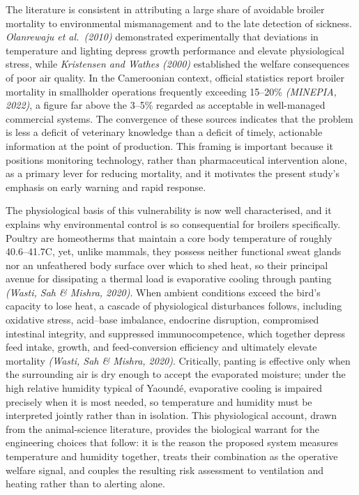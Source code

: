 \documentclass[12pt,a4paper]{report}
\begin{document}
The literature is consistent in attributing a large share of avoidable broiler mortality to environmental mismanagement and to the late detection of sickness. \textit{Olanrewaju et al.\ (2010)} demonstrated experimentally that deviations in temperature and lighting depress growth performance and elevate physiological stress, while \textit{Kristensen and Wathes (2000)} established the welfare consequences of poor air quality. In the Cameroonian context, official statistics report broiler mortality in smallholder operations frequently exceeding 15--20\% \textit{(MINEPIA, 2022)}, a figure far above the 3--5\% regarded as acceptable in well-managed commercial systems. The convergence of these sources indicates that the problem is less a deficit of veterinary knowledge than a deficit of timely, actionable information at the point of production. This framing is important because it positions monitoring technology, rather than pharmaceutical intervention alone, as a primary lever for reducing mortality, and it motivates the present study's emphasis on early warning and rapid response.

The physiological basis of this vulnerability is now well characterised, and it explains why environmental control is so consequential for broilers specifically. Poultry are homeotherms that maintain a core body temperature of roughly 40.6--41.7\textdegree C, yet, unlike mammals, they possess neither functional sweat glands nor an unfeathered body surface over which to shed heat, so their principal avenue for dissipating a thermal load is evaporative cooling through panting \textit{(Wasti, Sah \& Mishra, 2020)}. When ambient conditions exceed the bird's capacity to lose heat, a cascade of physiological disturbances follows, including oxidative stress, acid--base imbalance, endocrine disruption, compromised intestinal integrity, and suppressed immunocompetence, which together depress feed intake, growth, and feed-conversion efficiency and ultimately elevate mortality \textit{(Wasti, Sah \& Mishra, 2020)}. Critically, panting is effective only when the surrounding air is dry enough to accept the evaporated moisture; under the high relative humidity typical of Yaound\'e, evaporative cooling is impaired precisely when it is most needed, so temperature and humidity must be interpreted jointly rather than in isolation. This physiological account, drawn from the animal-science literature, provides the biological warrant for the engineering choices that follow: it is the reason the proposed system measures temperature and humidity together, treats their combination as the operative welfare signal, and couples the resulting risk assessment to ventilation and heating rather than to alerting alone.
\end{document}
